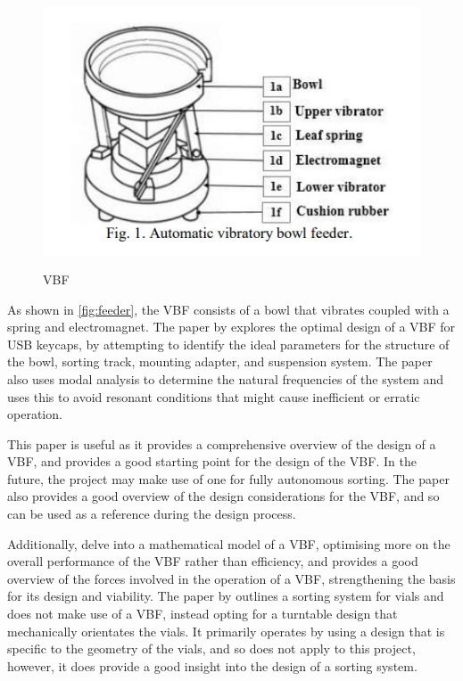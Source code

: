 \begin{figure}[H]
  \hfill
  \begin{minipage}[t]{\textwidth}
    \centering
    \includegraphics[height=8cm]{imgs/articles/feeder.jpg}
    \caption{VBF \cite{nam2019design}}
    \label{fig:feeder}
  \end{minipage}
\end{figure}

As shown in \autoref{fig:feeder}, the VBF consists of a bowl that vibrates coupled with a spring and electromagnet. The paper by \citet{nam2019design} explores the optimal design of a VBF for USB keycaps, by attempting to identify the ideal parameters for the structure of the bowl, sorting track, mounting adapter, and suspension system. The paper also uses modal analysis to determine the natural frequencies of the system and uses this to avoid resonant conditions that might cause inefficient or erratic operation.

This paper is useful as it provides a comprehensive overview of the design of a VBF, and provides a good starting point for the design of the VBF. In the future, the project may make use of one for fully autonomous sorting. The paper also provides a good overview of the design considerations for the VBF, and so can be used as a reference during the design process.

Additionally, \citet{REINHART2010191} delve into a mathematical model of a VBF, optimising more on the overall performance of the VBF rather than efficiency, and \citet{ForceAnalysisofVibratoryBowlFeeder} provides a good overview of the forces involved in the operation of a VBF, strengthening the basis for its design and viability. The paper by \citet{zhang2019design} outlines a sorting system for vials and does not make use of a VBF, instead opting for a turntable design that mechanically orientates the vials. It primarily operates
by using a design that is specific to the geometry of the vials, and so does not apply to this project, however, it does provide a good insight into the design of a sorting system.

